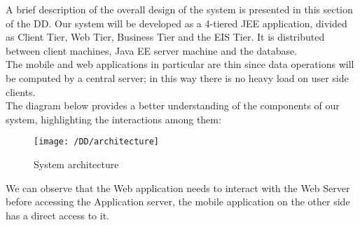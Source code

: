 A brief description of the overall design of the system is presented in this section of the DD.
Our system will be developed as a 4-tiered JEE application, divided as Client Tier, Web Tier, Business Tier and the EIS Tier. It is distributed between client machines, Java EE server machine and the database.
\\The mobile and web applications in particular are thin since data operations will be computed by a central server; in this way there is no heavy load on user side clients.
\\The diagram below provides a better understanding of the components of our system, highlighting the interactions among them:
\begin{figure}[!ht]
  \centering
  \vspace{0.2cm}
  \texttt{[image: /DD/architecture]}\\
  \vspace{0.4cm}
  \caption{System architecture} 
  \label{fig:architecture}
\end{figure}

We can observe that the Web application needs to interact with the Web Server before accessing the Application server, the mobile application on the other side has a direct access to it.
